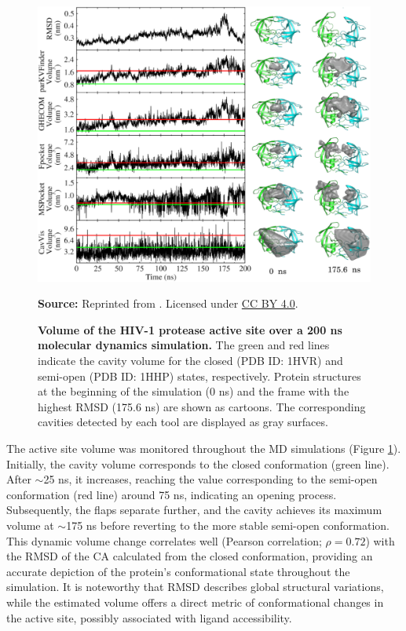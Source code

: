 \documentclass[Ingles]{phdthesis}
\begin{document}
\begin{figure}[h]
  \centerline{\includegraphics[scale=1.05]{images/hiv1-protease-md-analysis.png}}
  \centerline{\tiny{\textbf{Source:} Reprinted from \cite{guerra2020}. Licensed under \href{https://creativecommons.org/licenses/by/4.0/}{CC BY 4.0}.}}
  \caption[Volume of the HIV-1 protease active site over a 200 ns molecular dynamics simulation]{\textbf{Volume of the HIV-1 protease active site over a 200 ns molecular dynamics simulation.} The green and red lines indicate the cavity volume for the closed (PDB ID: 1HVR) and semi-open (PDB ID: 1HHP) states, respectively. Protein structures at the beginning of the simulation (0 ns) and the frame with the highest \acs{RMSD} (175.6 ns) are shown as cartoons. The corresponding cavities detected by each tool are displayed as gray surfaces.}
  \label{fig:hiv1-protease-dm-analysis}
\end{figure}

The active site volume was monitored throughout the \acs{MD} simulations (Figure \ref{fig:hiv1-protease-dm-analysis}). Initially, the cavity volume corresponds to the closed conformation (green line). After $\sim$25 ns, it increases, reaching the value corresponding to the semi-open conformation (red line) around 75 ns, indicating an opening process. Subsequently, the flaps separate further, and the cavity achieves its maximum volume at $\sim$175 ns before reverting to the more stable semi-open conformation. This dynamic volume change correlates well (Pearson correlation; $\rho=0.72$) with the \ac{RMSD} of the \acs{CA} calculated from the closed conformation, providing an accurate depiction of the protein's conformational state throughout the simulation. It is noteworthy that \acs{RMSD} describes global structural variations, while the estimated volume offers a direct metric of conformational changes in the active site, possibly associated with ligand accessibility.
\end{document}
